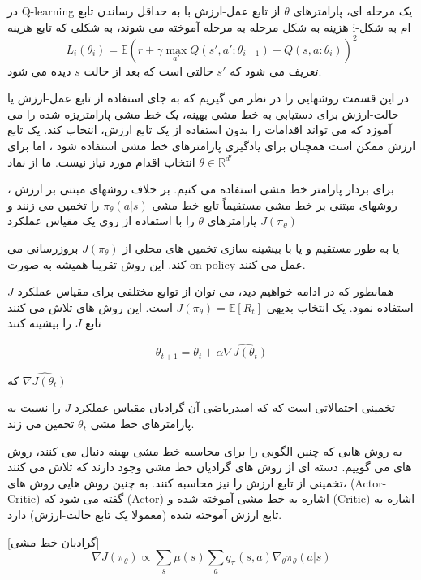 در Q-learning یک مرحله ای، پارامترهای $\theta$ از تابع عمل-ارزش با به حداقل رساندن تابع هزینه به شکل مرحله به مرحله آموخته می شوند، به شکلی که تابع هزینه i-ام به شکل 
$$L_i(\theta_i) = \mathbb{E} {\left( r+\gamma \max_{a'} Q(s',a'; \theta_{i-1})- Q(s,a:\theta_i) \right)}^2$$
 تعریف می شود که 
 $s'$
 حالتی است که بعد از حالت $s$ دیده می شود.


در این قسمت روشهایی را در نظر می گیریم که به جای استفاده از تابع عمل-ارزش یا حالت-ارزش برای دستیابی به خط مشی بهینه، یک خط مشی پارامتریزه  شده را می آموزد که می تواند اقدامات را بدون استفاده از یک تابع ارزش، انتخاب کند. یک تابع ارزش
ممکن است همچنان برای یادگیری پارامترهای خط مشی استفاده شود ، اما برای انتخاب اقدام مورد نیاز نیست. ما از نماد
$\theta \in \mathbb{R}^{d'}$
 


برای بردار پارامتر خط مشی استفاده می کنیم.
بر خلاف روشهای مبتنی بر ارزش ، روشهای مبتنی بر خط مشی مستقیماً تابع خط مشی 
$\pi_\theta(a|s)$
 را تخمین می زنند و پارامترهای $\theta$ را با استفاده از  روی یک مقیاس عملکرد  
$J(\pi_\theta)$

یا به طور مستقیم و یا با بیشینه سازی تخمین های محلی از 
$J(\pi_\theta)$
بروزرسانی می کند.  این روش تقریبا همیشه به صورت on-policy  عمل می کنند. 

همانطور که در ادامه خواهیم دید، می توان از توابع مختلفی برای مقیاس عملکرد $J$ استفاده نمود. یک انتخاب بدیهی 
$J(\pi_\theta) = \mathbb{E}[R_t]$
است. این روش های تلاش می کنند تابع $J$ را بیشینه کنند

$$\theta_{t+1}=\theta_t + \alpha \hat{\nabla J(\theta_t)}$$

که 
$\hat{\nabla J(\theta_t)}$

تخمینی احتمالاتی است که که امیدریاضی آن گرادیان مقیاس عملکرد $J$ را نسبت به پارامترهای خط مشی $\theta_t$ تخمین می زند.

به روش هایی که چنین الگویی را برای محاسبه خط مشی بهینه دنبال می کنند، روش های   می گوییم. دسته ای از روش های گرادیان خط مشی وجود دارند که تلاش می کنند تخمینی از تابع ارزش را نیز محاسبه کنند. به چنین روش هایی روش های،  (Actor-Critic) گفته می شود که  (Actor) اشاره به خط مشی آموخته شده و  (Critic) اشاره به تابع ارزش آموخته شده (معمولا یک تابع حالت-ارزش) دارد.

[گرادیان خط مشی]
$$\nabla J(\pi_\theta) \propto \sum_{s} \mu(s) \sum_{a} q_\pi(s,a) \nabla_\theta \pi_\theta(a|s)$$

